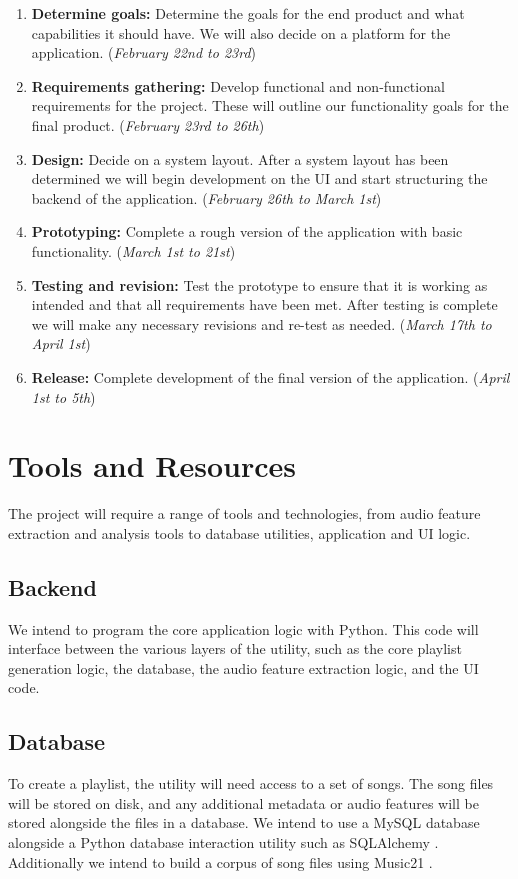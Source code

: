 \documentclass{article}
\begin{document}
\begin{enumerate}
    \item \textbf{Determine goals:} Determine the goals for the end product and what capabilities it should have. We will also decide on a platform for the application. ({\it February 22nd to 23rd})
    \item \textbf{Requirements gathering:} Develop functional and non-functional requirements for the project. These will outline our functionality goals for the final product. ({\it February 23rd to 26th})
    \item \textbf{Design:} Decide on a system layout. After a system layout has been determined we will begin development on the UI and start structuring the backend of the application. ({\it February 26th to March 1st})
    \item \textbf{Prototyping:} Complete a rough version of the application with basic functionality. ({\it March 1st to 21st})
    \item \textbf{Testing and revision:} Test the prototype to ensure that it is working as intended and that all requirements have been met. After testing is complete we will make any necessary revisions and re-test as need\-ed. ({\it March 17th to April 1st})
    \item \textbf{Release:} Complete development of the final version of the application. ({\it April 1st to 5th})
\end{enumerate}

\section{Tools and Resources}
The project will require a range of tools and technologies, from audio feature extraction and analysis tools to database utilities, application and UI logic.

\subsection{Backend}
We intend to program the core application logic with Python. This code will interface between the various layers of the utility, such as the core playlist generation logic, the database, the audio feature extraction logic, and the UI code.

\subsection{Database}
To create a playlist, the utility will need access to a set of songs. The song files will be stored on disk, and any additional metadata or audio features will be stored alongside the files in a database. We intend to use a MySQL database alongside a Python database interaction utility such as SQL\-Alchemy \cite{SQLAlchemy}. Additionally we intend to build a corpus of song files using Music21 \cite{Music21}.
\end{document}
